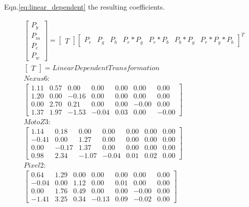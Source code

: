 Eqn.\ref{eq:linear_dependent} the resulting coefficients.

\begin{subequations}
\begin{align}
	&\begin{bmatrix}
	    P_{y} \\
	    P_{m} \\
	    P_{c} \\
	    P_{w}
	\end{bmatrix}
	=
	\begin{bmatrix}
		T
	\end{bmatrix}
	\begin{bmatrix}
	    P_{r} 	       &
	    P_{g} 	       &
	    P_{b} 	       &
	    P_{r}*P_{g}        &
	    P_{r}*P_{b}        &
	    P_{b}*P_{g}        &
	    P_{r}*P_{g}*P_{b}
	\end{bmatrix}^T
	\\
	&\begin{bmatrix}
		T
	\end{bmatrix}
	=
		Linear Dependent Transformation \nonumber
	\\
	&Nexus 6: \nonumber
	\\
	&\begin{bmatrix}
	      1.11 &       0.57 &       0.00 &       0.00 &       0.00 &       0.00 &       0.00 \\
	      1.20 &       0.00 &      -0.16 &       0.00 &       0.00 &       0.00 &       0.00 \\
	      0.00 &       2.70 &       0.21 &       0.00 &       0.00 &      -0.00 &       0.00 \\
	      1.37 &       1.97 &      -1.53 &      -0.04 &       0.03 &       0.00 &      -0.00
	\end{bmatrix}
	\\
	&Moto Z3: \nonumber
	\\
	&\begin{bmatrix}
	      1.14 &       0.18 &       0.00 &       0.00 &       0.00 &       0.00 &       0.00 \\
	     -0.41 &       0.00 &       1.27 &       0.00 &       0.00 &       0.00 &       0.00 \\
	      0.00 &      -0.17 &       1.37 &       0.00 &       0.00 &       0.00 &       0.00 \\
	      0.98 &       2.34 &      -1.07 &      -0.04 &       0.01 &       0.02 &       0.00
	\end{bmatrix}
	\\
	&Pixel 2: \nonumber
	\\
	&\begin{bmatrix}
	      0.64 &       1.29 &       0.00 &       0.00 &       0.00 &       0.00 &       0.00 \\
	     -0.04 &       0.00 &       1.12 &       0.00 &       0.01 &       0.00 &       0.00 \\
	      0.00 &       1.76 &       0.49 &       0.00 &       0.00 &      -0.00 &       0.00 \\
	     -1.41 &       3.25 &       0.34 &      -0.13 &       0.09 &      -0.02 &       0.00
	\end{bmatrix}
\end{align}
	\label{eq:linear_dependent}
\end{subequations}
